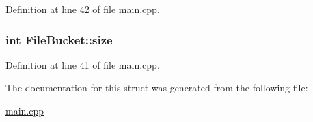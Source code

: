 Definition at line 42 of file main.\+cpp.

\hypertarget{struct_file_bucket_a16f787c14b9b69c959374749f70bb80a}{}
\subsubsection[{size}]{\setlength{\rightskip}{0pt plus 5cm}int File\+Bucket\+::size}\label{struct_file_bucket_a16f787c14b9b69c959374749f70bb80a}


Definition at line 41 of file main.\+cpp.



The documentation for this struct was generated from the following file\+:\begin{DoxyCompactItemize}
\item 
\hyperlink{main_8cpp}{main.\+cpp}\end{DoxyCompactItemize}
